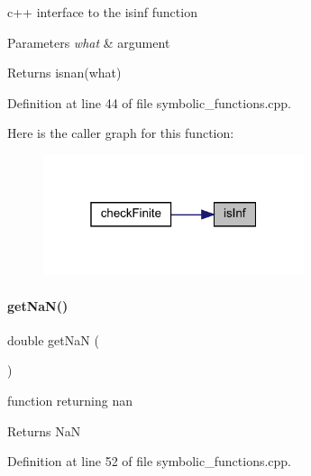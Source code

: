 c++ interface to the isinf function


\begin{DoxyParams}{Parameters}
{\em what} & argument \\
\hline
\end{DoxyParams}
\begin{DoxyReturn}{Returns}
isnan(what) 
\end{DoxyReturn}


Definition at line 44 of file symbolic\+\_\+functions.\+cpp.

Here is the caller graph for this function\+:
\nopagebreak
\begin{figure}[H]
\begin{center}
\leavevmode
\includegraphics[width=217pt]{namespaceamici_a10c0a2eb43575a155a34f5bb280f7973_icgraph}
\end{center}
\end{figure}
\mbox{\label{namespaceamici_ad41a03e53c2aaeeb82aad5791bf3ee28}} 
\paragraph{\texorpdfstring{getNaN()}{getNaN()}}
{\footnotesize\ttfamily double get\+NaN (\begin{DoxyParamCaption}{ }\end{DoxyParamCaption})}

function returning nan

\begin{DoxyReturn}{Returns}
NaN 
\end{DoxyReturn}


Definition at line 52 of file symbolic\+\_\+functions.\+cpp.

